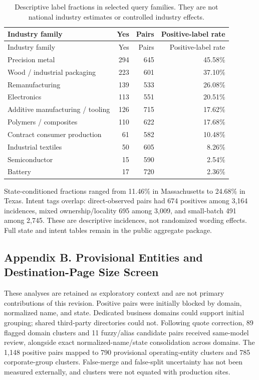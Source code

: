 \documentclass[10pt]{article}
\begin{document}
\begin{longtable}[]{@{}lrrr@{}}
\caption{Descriptive label fractions in selected query families. They are not national industry estimates or controlled industry effects.}\tabularnewline
\toprule\noalign{}
Industry family & Yes & Pairs & Positive-label rate \\
\midrule\noalign{}
\endfirsthead
\toprule\noalign{}
Industry family & Yes & Pairs & Positive-label rate \\
\midrule\noalign{}
\endhead
\bottomrule\noalign{}
\endlastfoot
Precision metal & 294 & 645 & 45.58\% \\
Wood / industrial packaging & 223 & 601 & 37.10\% \\
Remanufacturing & 139 & 533 & 26.08\% \\
Electronics & 113 & 551 & 20.51\% \\
Additive manufacturing / tooling & 126 & 715 & 17.62\% \\
Polymers / composites & 110 & 622 & 17.68\% \\
Contract consumer production & 61 & 582 & 10.48\% \\
Industrial textiles & 50 & 605 & 8.26\% \\
Semiconductor & 15 & 590 & 2.54\% \\
Battery & 17 & 720 & 2.36\% \\
\end{longtable}

State-conditioned fractions ranged from 11.46\% in Massachusetts to 24.68\% in Texas. Intent tags overlap: direct-observed pairs had 674 positives among 3,164 incidences, mixed ownership/locality 695 among 3,009, and small-batch 491 among 2,745. These are descriptive incidences, not randomized wording effects. Full state and intent tables remain in the public aggregate package.

\hypertarget{appendix-b.-provisional-entities-and-destination-page-size-screen}{%
\subsection{Appendix B. Provisional Entities and Destination-Page Size Screen}\label{appendix-b.-provisional-entities-and-destination-page-size-screen}}

These analyses are retained as exploratory context and are not primary contributions of this revision. Positive pairs were initially blocked by domain, normalized name, and state. Dedicated business domains could support initial grouping; shared third-party directories could not. Following quote correction, 89 flagged domain clusters and 11 fuzzy/alias candidate pairs received same-model review, alongside exact normalized-name/state consolidation across domains. The 1,148 positive pairs mapped to 790 provisional operating-entity clusters and 785 corporate-group clusters. False-merge and false-split uncertainty has not been measured externally, and clusters were not equated with production sites.
\end{document}

